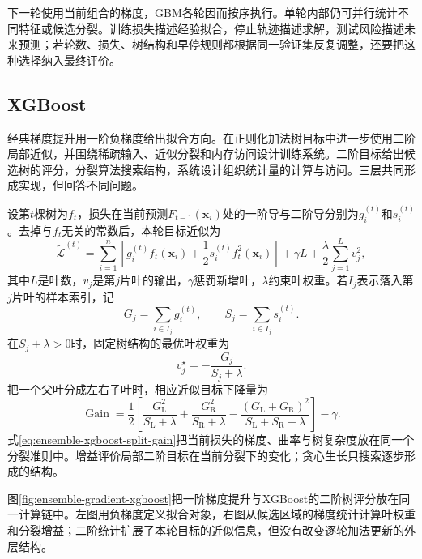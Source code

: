 下一轮使用当前组合的梯度，GBM各轮因而按序执行。单轮内部仍可并行统计不同特征或候选分裂。训练损失描述经验拟合，停止轨迹描述求解，测试风险描述未来预测；若轮数、损失、树结构和早停规则都根据同一验证集反复调整，还要把这种选择纳入最终评价。

\subsection{XGBoost}
\label{sec:ensemble-xgboost}

经典梯度提升用一阶负梯度给出拟合方向。在正则化加法树目标中进一步使用二阶局部近似，并围绕稀疏输入、近似分裂和内存访问设计训练系统。二阶目标给出候选树的评分，分裂算法搜索结构，系统设计组织统计量的计算与访问。三层共同形成实现，但回答不同问题。

设第$t$棵树为$f_t$，损失在当前预测$F_{t-1}(\bm{x}_i)$处的一阶导与二阶导分别为$g_i^{(t)}$和$s_i^{(t)}$。去掉与$f_t$无关的常数后，本轮目标近似为
\begin{equation}
  \widetilde{\mathcal{L}}^{(t)}
  =
  \sum_{i=1}^{n}
  \left[
    g_i^{(t)}f_t(\bm{x}_i)
    +\frac{1}{2}s_i^{(t)}f_t^2(\bm{x}_i)
  \right]
  +\gamma L
  +\frac{\lambda}{2}\sum_{j=1}^{L}v_j^2,
  \label{eq:ensemble-xgboost-objective}
\end{equation}
其中$L$是叶数，$v_j$是第$j$片叶的输出，$\gamma$惩罚新增叶，$\lambda$约束叶权重。若$I_j$表示落入第$j$片叶的样本索引，记
\[
  G_j=\sum_{i\in I_j}g_i^{(t)},
  \qquad
  S_j=\sum_{i\in I_j}s_i^{(t)}.
\]
在$S_j+\lambda>0$时，固定树结构的最优叶权重为
\begin{equation}
  v_j^\star=-\frac{G_j}{S_j+\lambda}.
  \label{eq:ensemble-xgboost-leaf-weight}
\end{equation}
把一个父叶分成左右子叶时，相应近似目标下降量为
\begin{equation}
  \operatorname{Gain}
  =
  \frac{1}{2}
  \left[
    \frac{G_{\mathrm{L}}^2}{S_{\mathrm{L}}+\lambda}
    +
    \frac{G_{\mathrm{R}}^2}{S_{\mathrm{R}}+\lambda}
    -
    \frac{(G_{\mathrm{L}}+G_{\mathrm{R}})^2}
         {S_{\mathrm{L}}+S_{\mathrm{R}}+\lambda}
  \right]
  -\gamma.
  \label{eq:ensemble-xgboost-split-gain}
\end{equation}
式\eqref{eq:ensemble-xgboost-split-gain}把当前损失的梯度、曲率与树复杂度放在同一个分裂准则中。增益评价局部二阶目标在当前分裂下的变化；贪心生长只搜索逐步形成的结构。

图\ref{fig:ensemble-gradient-xgboost}把一阶梯度提升与XGBoost的二阶树评分放在同一计算链中。左图用负梯度定义拟合对象，右图从候选区域的梯度统计计算叶权重和分裂增益；二阶统计扩展了本轮目标的近似信息，但没有改变逐轮加法更新的外层结构。

